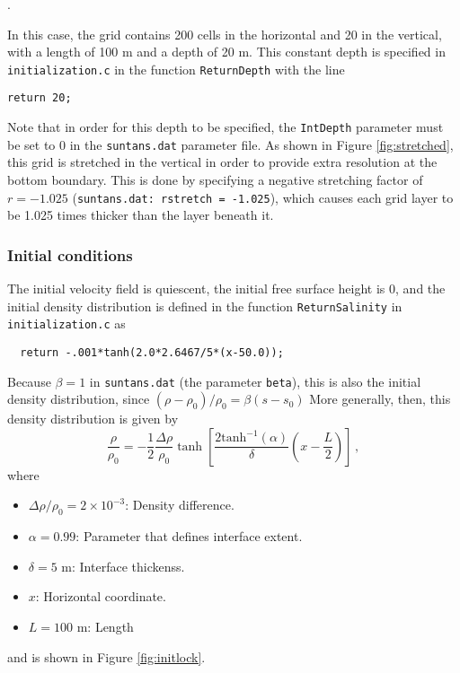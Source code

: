\medskip
\noindent
\mfiledownload.

\medskip
\noindent
In this case, the grid contains 200 cells in the horizontal and 20 in the vertical, with
a length of 100 m and a depth of 20 m.  This constant depth is specified in \verb+initialization.c+
in the function \verb+ReturnDepth+ with the line
\begin{verbatim}
return 20;
\end{verbatim}
Note that in order for this depth to be specified, the \verb+IntDepth+ parameter must
be set to 0 in the \verb+suntans.dat+ parameter file.  As shown in Figure \ref{fig:stretched},
this grid is stretched in the
vertical in order to provide extra resolution at the bottom boundary.  This is done by
specifying a negative stretching factor of $r=-1.025$ (\verb+suntans.dat: rstretch = -1.025+),
which causes each grid layer to be 1.025 times thicker than the layer beneath it.  

\subsubsection{Initial conditions}

The initial velocity field is quiescent, the initial free surface height is 0,
and the initial density distribution is defined in the function \verb+ReturnSalinity+
in \verb+initialization.c+ as
\begin{verbatim}
  return -.001*tanh(2.0*2.6467/5*(x-50.0));
\end{verbatim}
Because $\beta=1$ in \verb+suntans.dat+ (the parameter \verb+beta+), this is also the initial density 
distribution, since $(\rho-\rho_0)/\rho_0 = \beta(s-s_0)$ More generally, then, 
this density distribution is given by
\[
\frac{\rho}{\rho_0} = -\frac{1}{2}\frac{\Delta\rho}{\rho_0}
\tanh\left[\frac{2\mbox{tanh}^{-1}(\alpha)}{\delta}\left(x-\frac{L}{2}\right)\right]\,,
\]
where
\begin{itemize}
\item $\Delta\rho/\rho_0=2\times 10^{-3}$: Density difference.
\item $\alpha=0.99$: Parameter that defines interface extent.
\item $\delta=5$ m: Interface thickenss.
\item $x$: Horizontal coordinate.
\item $L=100$ m: Length
\end{itemize}
and is shown in Figure \ref{fig:initlock}. 

